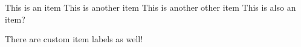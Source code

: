 \documentclass[12pt]{article}
\begin{document}
\itemGap
\begin{blockYellowDashRegular}
    \begin{blockCyanSolidLight}
    \end{blockCyanSolidLight}
    
    \begin{blockBlueSolidRegular}
    \end{blockBlueSolidRegular}
    
    \begin{blockPurpleSolidBold}
    \end{blockPurpleSolidBold}
\end{blockYellowDashRegular}

\note
    \item This is an item
    \itemStar This is another item
    \itemAst This is another other item
    \itemNaN This is also an item?
    \item[$\to$] There are custom item labels as well!
\xNote
\end{document}
